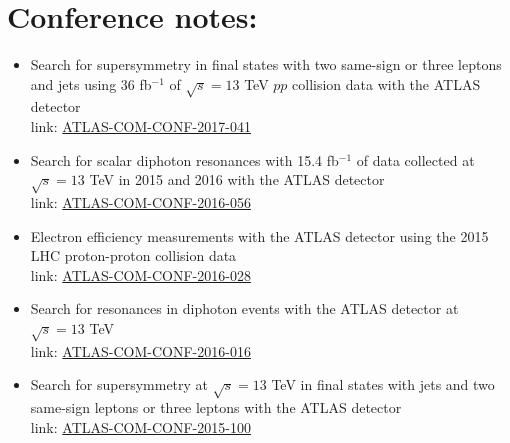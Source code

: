 \documentclass[12pt]{article}
\begin{document}
\section{Conference notes:}
\begin{itemize}
\item Search for supersymmetry in final states with two same-sign or three leptons and jets using 36 fb$^{-1}$ of $\sqrt{s} = 13$ TeV $pp$ collision data with the ATLAS detector\\
      link: \href{https://cds.cern.ch/record/2261952}{ATLAS-COM-CONF-2017-041}
\item Search for scalar diphoton resonances with 15.4 fb$^{-1}$ of data collected at $\sqrt{s} = 13$ TeV in 2015 and 2016 with the ATLAS detector\\
      link: \href{https://cds.cern.ch/record/2199338}{ATLAS-COM-CONF-2016-056}
\item Electron efficiency measurements with the ATLAS detector using the 2015 LHC proton-proton collision data\\
      link: \href{https://cds.cern.ch/record/2142831}{ATLAS-COM-CONF-2016-028}
\item Search for resonances in diphoton events with the ATLAS detector at $\sqrt{s} = 13$ TeV\\
      link: \href{https://cds.cern.ch/record/2138074}{ATLAS-COM-CONF-2016-016}
\item Search for supersymmetry at $\sqrt{s} = 13$ TeV in final states with jets and two same-sign leptons or three leptons with the ATLAS detector\\
      link: \href{https://cds.cern.ch/record/2114088}{ATLAS-COM-CONF-2015-100}
\end{itemize}
\end{document}
